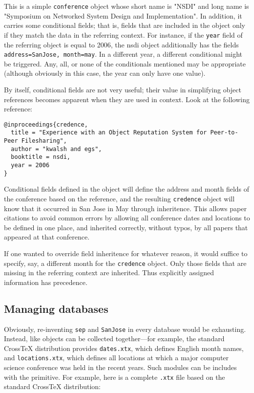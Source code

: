 \documentclass{article}
\newcommand{\XTeX}{Cross\TeX}
\begin{document}
This is a simple \texttt{conference} object whose short name is "NSDI"
and long name is "Symposium on Networked System Design and
Implementation". In addition, it carries some conditional fields; that is, 
fields that are included in the object only if they match the data in the
referring context. For instance, if the \texttt{year} field of the referring object is equal to 2006, the nsdi object additionally has the fields \texttt{address=SanJose, month=may}. In a different year, a different conditional might be triggered. Any, all, or none of the conditionals mentioned may be appropriate (although obviously in this case, the year can only have one value).

By itself, conditional fields are not very useful; their value in 
simplifying object references becomes apparent when they are used
in context. Look at the following reference:

\begin{small}\begin{verbatim}
@inproceedings{credence,
  title = "Experience with an Object Reputation System for Peer-to-Peer Filesharing",
  author = "kwalsh and egs",
  booktitle = nsdi,
  year = 2006
}
\end{verbatim}\end{small}

Conditional fields defined in the  object will define the
address and month fields of the conference based on the reference, 
and the resulting \texttt{credence} object will know that it occurred
in San Jose in May through inheritence. This allows paper citations
to avoid common errors by allowing all conference dates and locations
to be defined in one place, and inherited correctly, without typos,
by all papers that appeared at that conference. 

If one wanted to override field inheritence for whatever reason, it would suffice to specify, say, a different month for the \texttt{credence} object. Only those fields that are missing in the referring context are inherited. Thus explicitly assigned information has precedence.

\subsection{Managing databases}

Obviously, re-inventing \texttt{sep} and \texttt{SanJose} in every
database would be exhausting. Instead, like objects can be collected
together---for example, the standard \XTeX{} distribution provides 
\texttt{dates.xtx}, which defines English month names, and 
\texttt{locations.xtx}, which defines all locations at which a 
major computer science conference was held in the recent years.
Such modules can be includes with the  primitive.
For example, here is a complete \texttt{.xtx}
file based on the standard \XTeX{} distribution:
\end{document}
